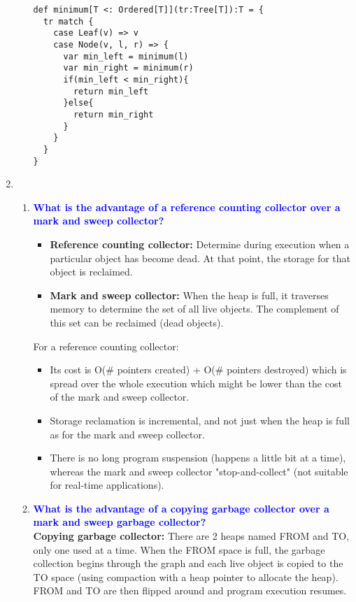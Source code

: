 \documentclass[10pt]{article}
\begin{document}
\begin{enumerate}
\begin{enumerate}
        \begin{verbatim}
def minimum[T <: Ordered[T]](tr:Tree[T]):T = {
  tr match {
    case Leaf(v) => v
    case Node(v, l, r) => {
      var min_left = minimum(l)
      var min_right = minimum(r)
      if(min_left < min_right){
        return min_left
      }else{
        return min_right
      }
    }
  }
}
        \end{verbatim}
    \end{enumerate}
    
    
    \item
    \begin{enumerate}
        \item \textbf{\textcolor{blue}{What is the advantage of a reference counting collector over a mark and sweep collector?}}
            \begin{itemize}
                \item \textbf{Reference counting collector: } Determine during execution when a particular object has become dead. At that point, the storage for that object is reclaimed.
                \item \textbf{Mark and sweep collector: } When the heap is full, it traverses memory to determine the set of all live objects. The complement of this set can be reclaimed (dead objects).
            \end{itemize}
            For a reference counting collector:
            \begin{itemize}
                \item Its cost is O($\#$ pointers created) + O($\#$ pointers destroyed) which is spread over the whole execution which might be lower than the cost of the mark and sweep collector.
                \item Storage reclamation is incremental, and not just when the heap is full as for the mark and sweep collector.
                \item There is no long program suspension (happens a little bit at a time), whereas the mark and sweep collector "stop-and-collect" (not suitable for real-time applications).
            \end{itemize}
        \item \textbf{\textcolor{blue}{What is the advantage of a copying garbage collector over a mark and sweep garbage collector?}}
            \\ \textbf{Copying garbage collector: } There are 2 heaps named FROM and TO, only one used at a time. When the FROM space is full, the garbage collection begins through the graph and each live object is copied to the TO space (using compaction with a heap pointer to allocate the heap). FROM and TO are then flipped around and program execution resumes.

\end{enumerate}
\end{enumerate}
\end{document}
